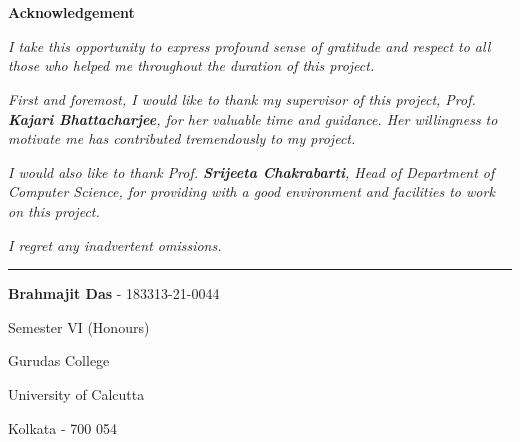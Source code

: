 \newpage

\section*{}%

\begin{center}
	{
		\Huge
		\textbf{Acknowledgement}
	}
\end{center}


\vspace{3cm}

\onehalfspacing

\textit{
	I take this opportunity to express profound sense of gratitude and respect to
	all those who helped me throughout the duration of this project.
}

\vspace{1cm}

\textit{
	First and foremost, I would like to thank my supervisor of this project, Prof.
	\textbf{Kajari Bhattacharjee}, for her valuable time and guidance. Her
	willingness to motivate me has contributed tremendously to my project.
}

\vspace{1cm}

\textit{
	I would also like to thank Prof. \textbf{Srijeeta Chakrabarti}, Head of
	Department of Computer Science, for providing with a good environment and
	facilities to work on this project.
}

\vspace{1cm}

\textit{
	I regret any inadvertent omissions.
}

\vfill

\rule{7cm}{0.4pt}

\textbf{Brahmajit Das} - 183313-21-0044

Semester VI (Honours)

Gurudas College

University of Calcutta

Kolkata - 700 054

\singlespacing
